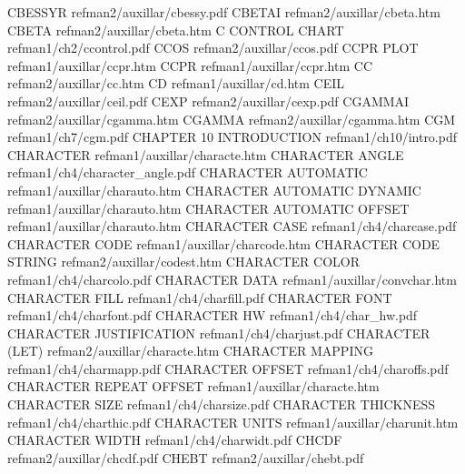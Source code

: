 CBESSYR                                 refman2/auxillar/cbessy.pdf
CBETAI                                  refman2/auxillar/cbeta.htm
CBETA                                   refman2/auxillar/cbeta.htm
C CONTROL CHART                         refman1/ch2/ccontrol.pdf
CCOS                                    refman2/auxillar/ccos.pdf
CCPR PLOT                               refman1/auxillar/ccpr.htm
CCPR                                    refman1/auxillar/ccpr.htm
CC                                      refman2/auxillar/cc.htm
CD                                      refman1/auxillar/cd.htm
CEIL                                    refman2/auxillar/ceil.pdf
CEXP                                    refman2/auxillar/cexp.pdf
CGAMMAI                                 refman2/auxillar/cgamma.htm
CGAMMA                                  refman2/auxillar/cgamma.htm
CGM                                     refman1/ch7/cgm.pdf
CHAPTER 10 INTRODUCTION                 refman1/ch10/intro.pdf
CHARACTER                               refman1/auxillar/characte.htm
CHARACTER ANGLE                         refman1/ch4/character_angle.pdf
CHARACTER AUTOMATIC                     refman1/auxillar/charauto.htm
CHARACTER AUTOMATIC DYNAMIC             refman1/auxillar/charauto.htm
CHARACTER AUTOMATIC OFFSET              refman1/auxillar/charauto.htm
CHARACTER CASE                          refman1/ch4/charcase.pdf
CHARACTER CODE                          refman1/auxillar/charcode.htm
CHARACTER CODE STRING                   refman2/auxillar/codest.htm
CHARACTER COLOR                         refman1/ch4/charcolo.pdf
CHARACTER DATA                          refman1/auxillar/convchar.htm
CHARACTER FILL                          refman1/ch4/charfill.pdf
CHARACTER FONT                          refman1/ch4/charfont.pdf
CHARACTER HW                            refman1/ch4/char_hw.pdf
CHARACTER JUSTIFICATION                 refman1/ch4/charjust.pdf
CHARACTER (LET)                         refman2/auxillar/characte.htm
CHARACTER MAPPING                       refman1/ch4/charmapp.pdf
CHARACTER OFFSET                        refman1/ch4/charoffs.pdf
CHARACTER REPEAT OFFSET                 refman1/auxillar/characte.htm
CHARACTER SIZE                          refman1/ch4/charsize.pdf
CHARACTER THICKNESS                     refman1/ch4/charthic.pdf
CHARACTER UNITS                         refman1/auxillar/charunit.htm
CHARACTER WIDTH                         refman1/ch4/charwidt.pdf
CHCDF                                   refman2/auxillar/chcdf.pdf
CHEBT                                   refman2/auxillar/chebt.pdf
